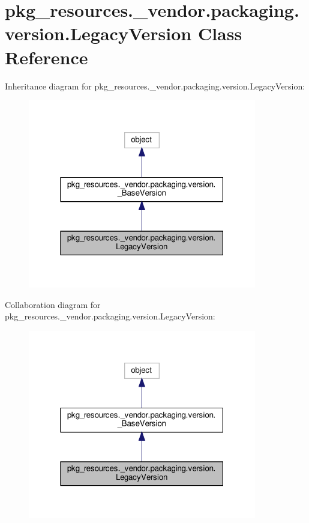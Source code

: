 \hypertarget{classpkg__resources_1_1__vendor_1_1packaging_1_1version_1_1LegacyVersion}{}\section{pkg\+\_\+resources.\+\_\+vendor.\+packaging.\+version.\+Legacy\+Version Class Reference}
\label{classpkg__resources_1_1__vendor_1_1packaging_1_1version_1_1LegacyVersion}


Inheritance diagram for pkg\+\_\+resources.\+\_\+vendor.\+packaging.\+version.\+Legacy\+Version\+:
\nopagebreak
\begin{figure}[H]
\begin{center}
\leavevmode
\includegraphics[width=283pt]{classpkg__resources_1_1__vendor_1_1packaging_1_1version_1_1LegacyVersion__inherit__graph}
\end{center}
\end{figure}


Collaboration diagram for pkg\+\_\+resources.\+\_\+vendor.\+packaging.\+version.\+Legacy\+Version\+:
\nopagebreak
\begin{figure}[H]
\begin{center}
\leavevmode
\includegraphics[width=283pt]{classpkg__resources_1_1__vendor_1_1packaging_1_1version_1_1LegacyVersion__coll__graph}
\end{center}
\end{figure}
